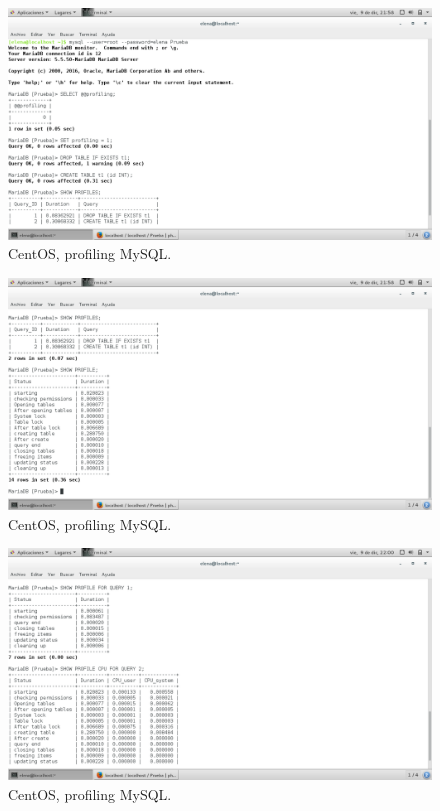 \begin{figure}[H] 
	\centering
	\includegraphics[width=14.7cm]{./img/ejercicio9_1.png} 	
	\caption{CentOS, profiling MySQL.} \label{fig:ejercicio9_1}
\end{figure}

\begin{figure}[H] 
	\centering
	\includegraphics[width=14.7cm]{./img/ejercicio9_2.png} 	
	\caption{CentOS, profiling MySQL.} \label{fig:ejercicio9_2}
\end{figure}

\begin{figure}[H] 
	\centering
	\includegraphics[width=14.7cm]{./img/ejercicio9_3.png} 	
	\caption{CentOS, profiling MySQL.} \label{fig:ejercicio9_3}
\end{figure}

